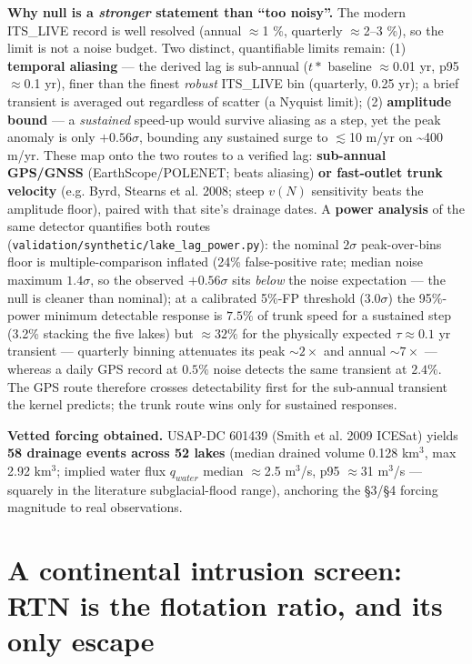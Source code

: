\documentclass[tc, manuscript]{copernicus}
\begin{document}
\textbf{Why null is a \emph{stronger} statement than ``too noisy''.} The modern ITS\_LIVE record is well resolved (annual \ensuremath{\approx}1 \%, quarterly \ensuremath{\approx}2–3 \%), so the limit is not a noise budget. Two distinct, quantifiable limits remain: (1) \textbf{temporal aliasing} — the derived lag is sub-annual ($t*$ baseline \ensuremath{\approx}0.01 yr, p95 \ensuremath{\approx}0.1 yr), finer than the finest \emph{robust} ITS\_LIVE bin (quarterly, 0.25 yr); a brief transient is averaged out regardless of scatter (a Nyquist limit); (2) \textbf{amplitude bound} — a \emph{sustained} speed-up would survive aliasing as a step, yet the peak anomaly is only $+0.56\sigma $, bounding any sustained surge to \ensuremath{\lesssim}10 m/yr on \textasciitilde{}400 m/yr. These map onto the two routes to a verified lag: \textbf{sub-annual GPS/GNSS} (EarthScope/POLENET; beats aliasing) \textbf{or fast-outlet trunk velocity} (e.g. Byrd, Stearns et al. 2008; steep $v(N)$ sensitivity beats the amplitude floor), paired with that site's drainage dates. A \textbf{power analysis} of the same detector quantifies both routes (\texttt{validation/\allowbreak{}synthetic/\allowbreak{}lake\_\allowbreak{}lag\_\allowbreak{}power.py}): the nominal $2\sigma $ peak-over-bins floor is multiple-comparison inflated (24\% false-positive rate; median noise maximum $1.4\sigma $, so the observed $+0.56\sigma $ sits \emph{below} the noise expectation — the null is cleaner than nominal); at a calibrated 5\%-FP threshold ($3.0\sigma $) the 95\%-power minimum detectable response is $7.5\%$ of trunk speed for a sustained step (3.2\% stacking the five lakes) but $\approx 32\%$ for the physically expected $\tau \approx 0.1$ yr transient — quarterly binning attenuates its peak $\sim 2\times $ and annual $\sim 7\times $ — whereas a daily GPS record at $0.5\%$ noise detects the same transient at $2.4\%$. The GPS route therefore crosses detectability first for the sub-annual transient the kernel predicts; the trunk route wins only for sustained responses.

\textbf{Vetted forcing obtained.} USAP-DC 601439 (Smith et al. 2009 ICESat) yields \textbf{58 drainage events across 52 lakes} (median drained volume 0.128 km\ensuremath{^{3}}, max 2.92 km\ensuremath{^{3}}; implied water flux $q_{water}$ median \ensuremath{\approx}2.5 m\ensuremath{^{3}}/s, p95 \ensuremath{\approx}31 m\ensuremath{^{3}}/s — squarely in the literature subglacial-flood range), anchoring the §3/§4 forcing magnitude to real observations.

\section{A continental intrusion screen: RTN is the flotation ratio, and its only escape}
\end{document}
